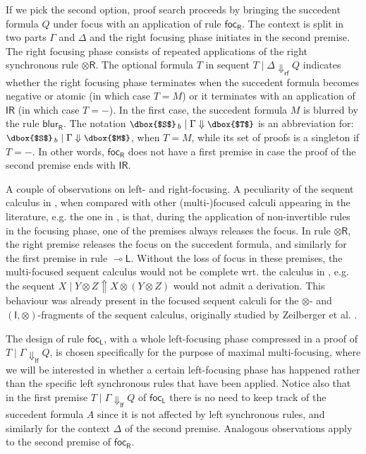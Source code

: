 \documentclass[runningheads]{llncs}
\newcommand{\tr}{\otimes \mathsf{R}}
\newcommand{\lleft}{{\multimap}\mathsf{L}}
\newcommand{\unitr}{\mathsf{IR}}
\newcommand{\otR}{\tr}
\newcommand{\lolliL}{\lleft}
\newcommand{\IR}{\unitr}
\newcommand{\ot}{\otimes}
\newcommand{\I}{\mathsf{I}}
\newcommand{\lf}{\dn_\mathsf{lf}}%
\newcommand{\rf}{\dn_\mathsf{rf}}%
\newcommand{\up}{\Uparrow}
\newcommand{\dn}{\Downarrow}
\newcommand{\focL}{\mathsf{foc_L}}
\newcommand{\focR}{\mathsf{foc_R}}
\newcommand{\blurR}{\mathsf{blur_R}}
\begin{document}
If we pick the second option, proof search proceeds by bringing the succedent formula $Q$ under focus with an application of rule $\focR$. The context is split in two parts $\Gamma$ and $\Delta$ and the right focusing phase initiates in the second premise. The right focusing phase consists of repeated applications of the right synchronous rule $\otR$. The optional formula $T$ in sequent $T \mid \Delta \rf Q$ indicates whether the right focusing phase terminates when the succedent formula becomes negative or atomic (in which case $T = M$) or it terminates with an application of $\IR$ (in which case $T = -$). In the first case, the succedent formula $M$ is blurred by the rule $\blurR$. The notation $\small\dbox{$S$}_{\, b} \mid \Gamma \dn \dbox{$T$}$ is an abbreviation for: $\small\dbox{$S$}_{\, b} \mid \Gamma \dn \dbox{$M$}$, when $T = M$, while its set of proofs is a singleton if $T = -$. In other words, $\focR$ does not have a first premise in case the proof of the second premise ends with $\IR$.

A couple of observations on left- and right-focusing.
A peculiarity of the sequent calculus in , when compared with other (multi-)focused calculi appearing in the literature, e.g. the one in \cite{chaudhuri:canonical:2008}, is that, during the application of non-invertible rules in the focusing phase, one of the premises always releases the focus. In rule $\otR$, the right premise releases the focus on the succedent formula, and similarly for the  first premise in rule $\lolliL$. Without the loss of focus in these premises, the multi-focused sequent calculus would not be complete wrt. the calculus in , e.g. the sequent $X \mid Y  \ot Z \up X \ot (Y \ot Z)$ would not admit a derivation. This behaviour was already present in the focused sequent calculi for the $\ot$- and $(\I,\ot)$-fragments of the sequent calculus, originally studied by Zeilberger et al. \cite{zeilberger:semiassociative:19,uustalu:sequent:2021}.

The design of rule $\focL$, with a whole left-focusing phase compressed in a proof of $T \mid \Gamma \lf Q$, is chosen specifically for the purpose of maximal multi-focusing, where we will be interested in whether a certain left-focusing phase has happened rather than the specific left synchronous rules that have been applied. Notice also that in the first premise $T \mid \Gamma \lf Q$ of $\focL$ there is no need to keep track of the succedent formula $A$ since it is not affected by left synchronous rules, and similarly for the context $\Delta$ of the second premise. Analogous observations apply to the second premise of $\focR$.
\end{document}
